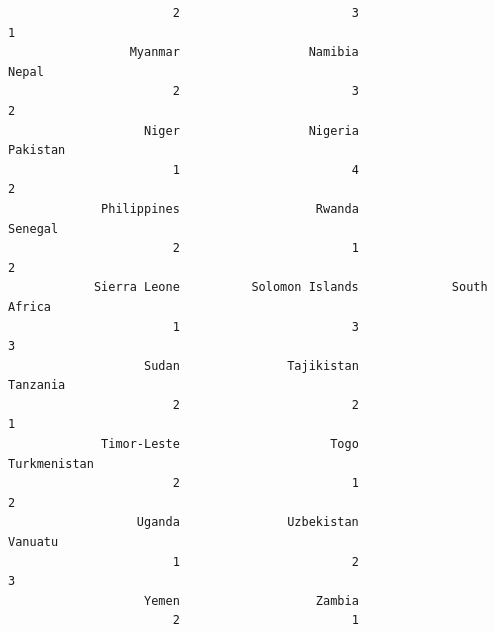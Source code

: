 \documentclass[
]{article}
\newenvironment{Shaded}{}{}
\newcommand{\AttributeTok}[1]{#1}
\newcommand{\DecValTok}[1]{#1}
\newcommand{\FunctionTok}[1]{#1}
\newcommand{\NormalTok}[1]{#1}
\newcommand{\OtherTok}[1]{\textcolor[rgb]{1.00,0.25,0.00}{#1}}
\newcommand{\SpecialCharTok}[1]{\textcolor[rgb]{0.00,0.50,0.50}{#1}}
\begin{document}
\begin{verbatim}
                       2                        3                        1 
                 Myanmar                  Namibia                    Nepal 
                       2                        3                        2 
                   Niger                  Nigeria                 Pakistan 
                       1                        4                        2 
             Philippines                   Rwanda                  Senegal 
                       2                        1                        2 
            Sierra Leone          Solomon Islands             South Africa 
                       1                        3                        3 
                   Sudan               Tajikistan                 Tanzania 
                       2                        2                        1 
             Timor-Leste                     Togo             Turkmenistan 
                       2                        1                        2 
                  Uganda               Uzbekistan                  Vanuatu 
                       1                        2                        3 
                   Yemen                   Zambia 
                       2                        1 
\end{verbatim}

\begin{Shaded}
\end{Shaded}
\end{document}
